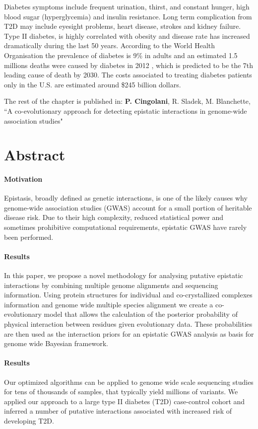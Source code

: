 Diabetes symptoms include frequent urination, thirst, and constant hunger, high blood sugar (hyperglycemia) and insulin resistance. Long term complication from T2D may include eyesight problems, heart disease, strokes and kidney failure. Type II diabetes, is highly correlated with obesity and disease rate has increased dramatically during the last 50 years. According to the World Health Organisation the prevalence of diabetes is 9\% in adults and an estimated 1.5 millions deaths were caused by diabetes in 2012 \cite{guariguata2014global}, which is predicted to be the 7th leading cause of death by 2030. The costs associated to treating diabetes patients only in the U.S. are estimated around \$245 billion dollars.

The rest of the chapter is published in: \textbf{P. Cingolani}, R. Sladek, M. Blanchette, ``A co-evolutionary approach for detecting epistatic interactions in genome-wide association studies"

\section{Abstract}

\paragraph{Motivation} Epistasis, broadly defined as genetic interactions, is one of the likely causes why genome-wide association studies (GWAS) account for a small portion of heritable disease risk. Due to their high complexity, reduced statistical power and sometimes prohibitive computational requirements, epistatic GWAS have rarely been performed. 

\paragraph{Results} In this paper, we propose a novel methodology for analysing putative epistatic interactions by combining multiple genome alignments and sequencing information. Using protein structures for individual and co-crystallized complexes information and genome wide multiple species alignment we create a co-evolutionary model that allows the calculation of the posterior probability of physical interaction between residues given evolutionary data. These probabilities are then used as the interaction priors for an epistatic GWAS analysis as basis for genome wide Bayesian framework. 

\paragraph{Results} Our optimized algorithms can be applied to genome wide scale sequencing studies for tens of thousands of samples, that typically yield millions of variants. We applied our approach to a large type II diabetes (T2D) case-control cohort and inferred a number of putative interactions associated with increased risk of developing T2D. 


